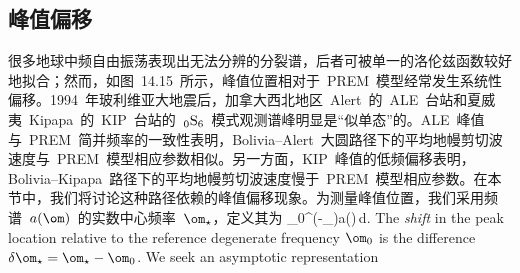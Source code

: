 \renewcommand{\thesubsection}{$\!\!\!\raise1.3ex\hbox{$\star$}\!\!$
\arabic{chapter}.\arabic{section}.\arabic{subsection}}
\subsection{峰值偏移}
%
\renewcommand{\thesubsection}{\arabic{chapter}.\arabic{section}.\arabic{subsection}}

很多地球中频自由振荡表现出无法分辨的分裂谱，后者可被单一的洛伦兹函数较好地拟合；然而，如图~14.15~所示，峰值位置相对于~PREM~模型经常发生系统性偏移。1994~年玻利维亚大地震后，加拿大西北地区~Alert~的~ALE~台站和夏威夷~Kipapa~的~KIP~台站的~${}_0{\rm S}_{6}$~模式观测谱峰明显是“似单态”的。ALE~峰值与~PREM~简并频率的一致性表明，Bolivia--Alert~大圆路径下的平均地幔剪切波速度与~PREM~模型相应参数相似。另一方面，KIP~峰值的低频偏移表明，Bolivia--Kipapa~路径下的平均地幔剪切波速度慢于~PREM~模型相应参数。在本节中，我们将讨论这种路径依赖的峰值偏移现象。为测量峰值位置，我们采用频谱~$a(\om)$~的实数中心频率~$\om_{\star}$，定义其为
\eq \label{14.re}
\real\int_0^{\infty}(\om-\omega_{\star})a(\om)\,d.
\en
\iffalse
The {\em shift\/} in the peak location relative
to the reference degenerate frequency $\om_0$ is the difference
$\delta\om_{\star}=\om_{\star}-\om_0$.
We seek an asymptotic representation
